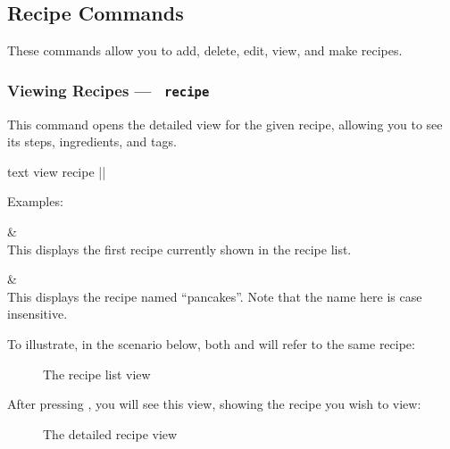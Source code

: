 
\pagebreak
\hypertarget{GroupRecipeCommands}{}
\subsection{Recipe Commands}

These commands allow you to add, delete, edit, view, and make recipes.

\hypertarget{ViewRecipeCommand}{}
\subsubsection{Viewing Recipes — \texttt{ recipe}}

	This command opens the detailed view for the given recipe, allowing you to see its steps, ingredients, and tags.

	 \begin{blockofcode}{text}
		view recipe |\itemref{}|
	\end{blockofcode}

	Examples:
	\begin{bulletlist}
		&  \\
			This displays the first recipe currently shown in the recipe list.

		&  \\
		This displays the recipe named \enquote{pancakes}. Note that the name here is case insensitive.

	\end{bulletlist}

	To illustrate, in the scenario below, both  and  will refer to the same recipe:

	\begin{figure}[!htbp]\centering\ContinuedFloat*
		\caption{The recipe list view}
	\end{figure}

	\pagebreak
	After pressing , you will see this view, showing the recipe you wish to view:

	\begin{figure}[!htbp]\centering\ContinuedFloat
		\caption{The detailed recipe view}
	\end{figure}




\pagebreak
\hypertarget{ListRecipeCommand}{}
